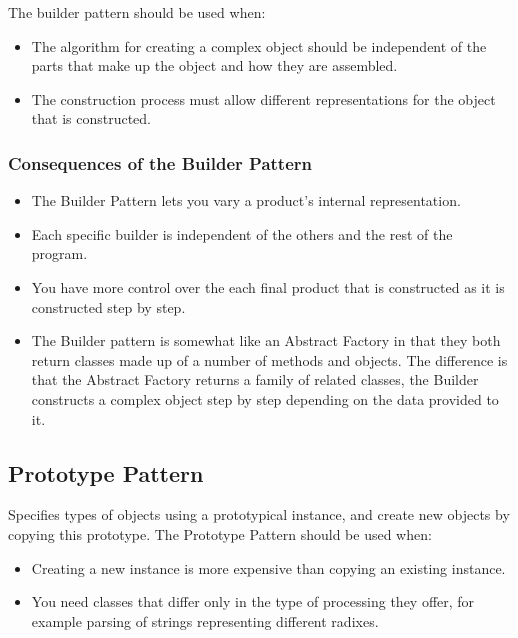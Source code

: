 \documentclass[12pt letter]{report}
\begin{document}


The builder pattern should be used when:
\begin{itemize}
  \item The algorithm for creating a complex object should be independent of the parts that make up the object and how they are assembled.
  \item The construction process must allow different representations for the object that is constructed.
\end{itemize}

\subsubsection{Consequences of the Builder Pattern}
\begin{itemize}
  \item The Builder Pattern lets you vary a product's internal representation.
  \item Each specific builder is independent of the others and the rest of the program.
  \item You have more control over the each final product that is constructed as it is constructed step by step.
  \item The Builder pattern is somewhat like an Abstract Factory in that they both return classes made up of a number of methods and objects. The
        difference is that the Abstract Factory returns a family of related classes, the Builder constructs a complex object step by step depending
        on the data provided to it.
\end{itemize}

\subsection{Prototype Pattern}
Specifies types of objects using a prototypical instance, and create new objects by copying this prototype. The Prototype Pattern should be used when:



\begin{itemize}
  \item Creating a new instance is more expensive than copying an existing instance.
  \item You need classes that differ only in the type of processing they offer, for example parsing of strings representing different radixes.
\end{itemize}
\end{document}
